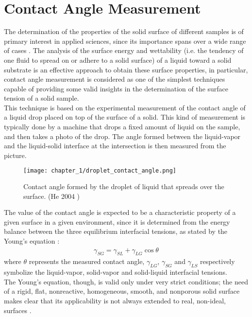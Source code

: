 \section{Contact Angle Measurement}
\label{sec:contact_angle_measurement}
The determination of the properties of the solid surface of different samples is of primary interest in applied sciences, since its importance spans over a wide range of cases \cite{kwokContactAngleMeasurement1999}. The analysis of the surface energy and wettability (i.e. the tendency of one fluid to spread on or adhere to a solid surface) of a liquid toward a solid substrate is an effective approach to obtain these surface properties, in particular, contact angle measurement is considered as one of the simplest techniques capable of providing some valid insights in the determination of the surface tension of a solid sample.
\\
This technique is based on the experimental measurement of the contact angle of a liquid drop placed on top of the surface of a solid. This kind of measurement is typically done by a machine that drops a fixed amount of liquid on the sample, and then takes a photo of the drop. The angle formed between the liquid-vapor and the liquid-solid interface at the intersection is then measured from the picture.
\begin{figure}[H]
    \centering
    \texttt{[image: chapter\_1/droplet\_contact\_angle.png]}
    \vspace*{10pt}
    \caption{Contact angle formed by the droplet of liquid that spreads over the surface. (He 2004 \cite{heContactAngleHysteresis2004})}
    \label{fig:contact_angle_example}
\end{figure}
The value of the contact angle is expected to be a characteristic property of a given surface in a given environment, since it is determined from the energy balance between the three equilibrium interfacial tensions, as stated by the Young's equation \cite{youngEssayCohesionFluids1805}:
\begin{align}
    \gamma_{SG} = \gamma_{SL} + \gamma_{LG} \cos\theta \label{eq:young_equation}
\end{align}
where $\theta$ represents the measured contact angle, $\gamma_{LG}$, $\gamma_{SG}$ and $\gamma_{LS}$ respectively symbolize the liquid-vapor, solid-vapor and solid-liquid interfacial tensions.
\\
The Young's equation, though, is valid only under very strict conditions; the need of a rigid, flat, nonreactive, homogeneous, smooth, and nonporous solid surface makes clear that its applicability is not always extended to real, non-ideal, surfaces \cite{kwokMeasuringInterpretingContact1998}.
